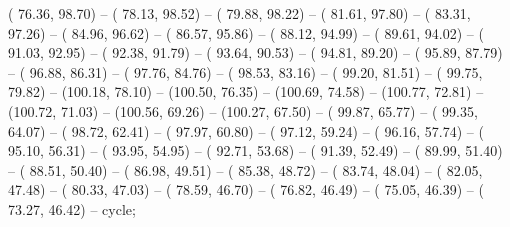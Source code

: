 \begin{scope}
	( 76.36, 98.70) --
	( 78.13, 98.52) --
	( 79.88, 98.22) --
	( 81.61, 97.80) --
	( 83.31, 97.26) --
	( 84.96, 96.62) --
	( 86.57, 95.86) --
	( 88.12, 94.99) --
	( 89.61, 94.02) --
	( 91.03, 92.95) --
	( 92.38, 91.79) --
	( 93.64, 90.53) --
	( 94.81, 89.20) --
	( 95.89, 87.79) --
	( 96.88, 86.31) --
	( 97.76, 84.76) --
	( 98.53, 83.16) --
	( 99.20, 81.51) --
	( 99.75, 79.82) --
	(100.18, 78.10) --
	(100.50, 76.35) --
	(100.69, 74.58) --
	(100.77, 72.81) --
	(100.72, 71.03) --
	(100.56, 69.26) --
	(100.27, 67.50) --
	( 99.87, 65.77) --
	( 99.35, 64.07) --
	( 98.72, 62.41) --
	( 97.97, 60.80) --
	( 97.12, 59.24) --
	( 96.16, 57.74) --
	( 95.10, 56.31) --
	( 93.95, 54.95) --
	( 92.71, 53.68) --
	( 91.39, 52.49) --
	( 89.99, 51.40) --
	( 88.51, 50.40) --
	( 86.98, 49.51) --
	( 85.38, 48.72) --
	( 83.74, 48.04) --
	( 82.05, 47.48) --
	( 80.33, 47.03) --
	( 78.59, 46.70) --
	( 76.82, 46.49) --
	( 75.05, 46.39) --
	( 73.27, 46.42) --
	cycle;


\end{scope}
